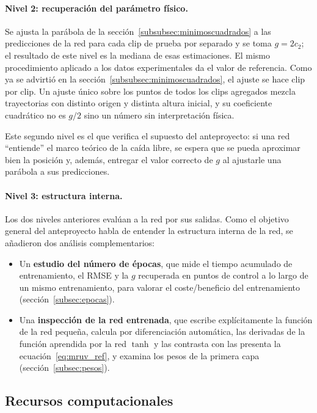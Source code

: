 \documentclass[titlepage,11pt]{article}
\begin{document}
\paragraph{Nivel 2: recuperación del parámetro físico.} Se ajusta la parábola
de la sección~\ref{subsubsec:minimoscuadrados} a las predicciones de la red
para cada clip de prueba por separado y se toma $g=2c_2$; el resultado de este nivel
 es la mediana de esas estimaciones. El mismo procedimiento aplicado a
los datos experimentales da el valor de referencia. Como ya se advirtió en la
sección~\ref{subsubsec:minimoscuadrados}, el ajuste se hace clip por clip.
Un ajuste único sobre los puntos de todos los clips agregados mezcla
trayectorias con distinto origen y distinta altura inicial, y su coeficiente
cuadrático no es $g/2$ sino un número sin interpretación física.

Este segundo nivel es el que verifica el supuesto del anteproyecto: si una red
\enquote{entiende} el marco teórico de la caída libre, se espera que se pueda aproximar bien la
posición y, además, entregar el valor correcto de $g$ al ajustarle una parábola a sus predicciones.

\paragraph{Nivel 3: estructura interna.} Los dos niveles anteriores evalúan a la
red por sus salidas. Como el objetivo general del anteproyecto habla de
entender la estructura interna de la red, se añadieron dos análisis complementarios:

\begin{itemize}
\item Un \textbf{estudio del número de épocas}, que mide el tiempo acumulado de
  entrenamiento, el RMSE y la $g$ recuperada en puntos de control a lo largo de
  un mismo entrenamiento, para valorar el coste/beneficio del entrenamiento
  (sección~\ref{subsec:epocas}).
\item Una \textbf{inspección de la red entrenada}, que escribe explícitamente
  la función de la red pequeña, calcula por diferenciación automática, las
  derivadas de la función aprendida por la red $\tanh$ y las contrasta con las
  presenta la ecuación~\eqref{eq:mruv_ref}, y examina los pesos de la primera
  capa (sección~\ref{subsec:pesos}).
\end{itemize}

\subsection{Recursos computacionales}
\label{subsec:recursos}
\end{document}
